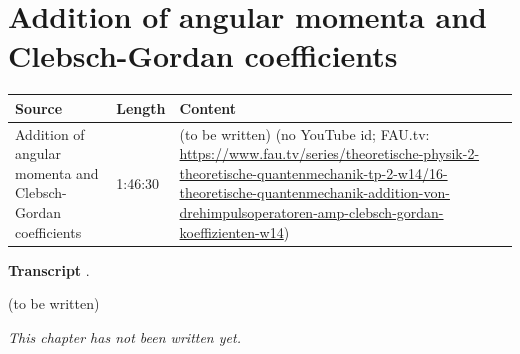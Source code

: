 \chapter{Addition of angular momenta and Clebsch-Gordan coefficients}\label{ch:c16}
\begin{paracol}{2}

\begin{sources}
\begin{tabularx}{\linewidth}{@{}l l L@{}}
\toprule
\textbf{Source} & \textbf{Length} & \textbf{Content}\\
\midrule
Addition of angular momenta and Clebsch-Gordan coefficients & 1:46:30 & (to be written) (no YouTube id; FAU.tv: \url{https://www.fau.tv/series/theoretische-physik-2-theoretische-quantenmechanik-tp-2-w14/16-theoretische-quantenmechanik-addition-von-drehimpulsoperatoren-amp-clebsch-gordan-koeffizienten-w14})\\
\bottomrule
\end{tabularx}

\smallskip
\textbf{Transcript} .
\end{sources}

\begin{reading}
(to be written)
\end{reading}

\emph{This chapter has not been written yet.}

\flushside
\end{paracol}
